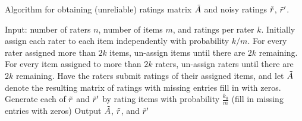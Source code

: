 \begin{algorithm}[t!]
\caption{Algorithm for obtaining (unreliable) ratings matrix $\tilde{A}$ and noisy 
ratings $\tilde{r}$, $\tilde{r}'$.}
\label{alg:create-A}
\begin{algorithmic}[1]
\State Input: number of raters $n$,  number of items $m$, and ratings per rater $k$.
\State Initially assign each rater to each item independently with probability $k/m$.  
\State For every rater assigned more than $2k$ items, un-assign items until 
       there are $2k$ remaining.
\State For every item assigned to more than $2k$
       raters, un-assign raters until there are $2k$ remaining.
\State Have the raters submit ratings of their assigned items, and let $\tilde{A}$ 
       denote the resulting matrix of ratings with missing entries fill in with 
       zeros.
\State Generate each of $\tilde{r}$ and $\tilde{r}'$ by rating items with probability $\frac{k_0}{m}$ (fill in missing entries with zeros)
\State Output $\tilde{A}$, $\tilde{r}$, and $\tilde{r}'$
\end{algorithmic}
\end{algorithm}


